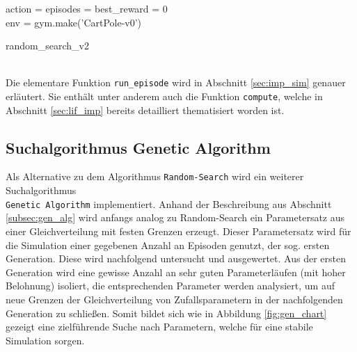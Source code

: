 		\begin{algorithm}
			
			
			action = episodes = best\_reward = 0\\
			env = gym.make('CartPole-v0')\\
			\caption{random\_search\_v2}
		\end{algorithm}\\
		Die elementare Funktion \texttt{run\_episode} wird in Abschnitt \ref{sec:imp_sim} genauer erläutert. Sie enthält unter anderem auch die Funktion \texttt{compute}, welche in Abschnitt \ref{sec:lif_imp} bereits detailliert thematisiert worden ist.
	\subsection{Suchalgorithmus Genetic Algorithm}
	\label{subsec:imp_ga}
		\enlargethispage{2\baselineskip}
		Als Alternative zu dem Algorithmus \texttt{Random-Search} wird ein weiterer Suchalgorithmus\\ \texttt{Genetic Algorithm} implementiert. Anhand der Beschreibung aus Abschnitt \ref{subsec:gen_alg} wird anfangs analog zu Random-Search ein Parametersatz aus einer Gleichverteilung mit festen Grenzen erzeugt. Dieser Parametersatz wird für die Simulation einer gegebenen Anzahl an Episoden genutzt, der sog. ersten Generation. Diese wird nachfolgend untersucht und ausgewertet. Aus der ersten Generation wird eine gewisse Anzahl an sehr guten Parameterläufen (mit hoher Belohnung) isoliert, die entsprechenden Parameter werden analysiert, um auf neue Grenzen der Gleichverteilung von Zufallsparametern in der nachfolgenden Generation zu schließen. Somit bildet sich wie in Abbildung \ref{fig:gen_chart} gezeigt eine zielführende Suche nach Parametern, welche für eine stabile Simulation sorgen.
		
